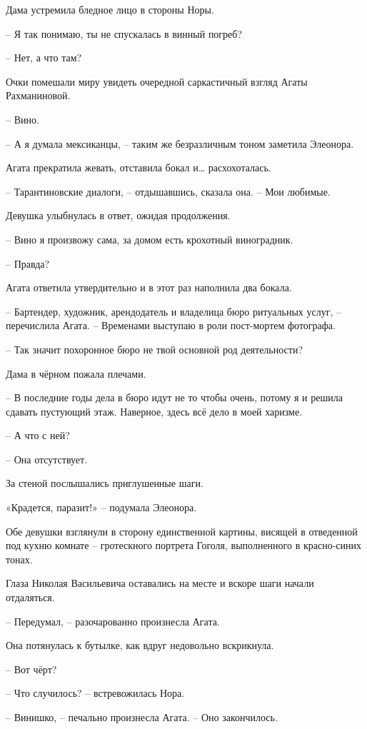 \documentclass[
  a5paperpaper,
  DIV=11,
  numbers=noendperiod]{scrreprt}
\begin{document}
Дама устремила бледное лицо в стороны Норы.

-- Я так понимаю, ты не спускалась в винный погреб?

-- Нет, а что там?

Очки помешали миру увидеть очередной саркастичный взгляд Агаты
Рахманиновой.

-- Вино.

-- А я думала мексиканцы, -- таким же безразличным тоном заметила
Элеонора.

Агата прекратила жевать, отставила бокал и\ldots{} расхохоталась.

-- Тарантиновские диалоги, -- отдышавшись, сказала она. -- Мои любимые.

Девушка улыбнулась в ответ, ожидая продолжения.

-- Вино я произвожу сама, за домом есть крохотный виноградник.

-- Правда?

Агата ответила утвердительно и в этот раз наполнила два бокала.

-- Бартендер, художник, арендодатель и владелица бюро ритуальных услуг,
-- перечислила Агата. -- Временами выступаю в роли пост-мортем
фотографа.

-- Так значит похоронное бюро не твой основной род деятельности?

Дама в чёрном пожала плечами.

-- В последние годы дела в бюро идут не то чтобы очень, потому я и
решила сдавать пустующий этаж. Наверное, здесь всё дело в моей харизме.

-- А что с ней?

-- Она отсутствует.

За стеной послышались приглушенные шаги.

«Крадется, паразит!» -- подумала Элеонора.

Обе девушки взглянули в сторону единственной картины, висящей в
отведенной под кухню комнате -- гротескного портрета Гоголя,
выполненного в красно-синих тонах.

Глаза Николая Васильевича оставались на месте и вскоре шаги начали
отдаляться.

-- Передумал, -- разочарованно произнесла Агата.

Она потянулась к бутылке, как вдруг недовольно вскрикнула.

-- Вот чёрт?

-- Что случилось? -- встревожилась Нора.

-- Винишко, -- печально произнесла Агата. -- Оно закончилось.
\end{document}
